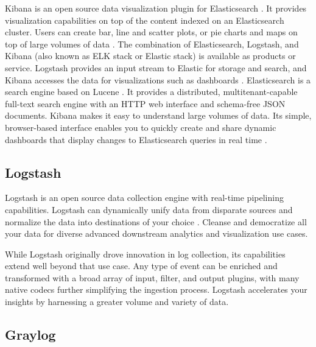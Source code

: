     Kibana is an open source data visualization plugin for
    Elasticsearch \cite{www-kibana-1}. It provides visualization
    capabilities on top of the content indexed on an Elasticsearch
    cluster. Users can create bar, line and scatter plots, or pie
    charts and maps on top of large volumes of
    data \cite{www-kibana-2}. The combination of Elasticsearch,
    Logstash, and Kibana (also known as ELK stack or Elastic stack) is
    available as products or service. Logstash provides an input
    stream to Elastic for storage and search, and Kibana accesses the
    data for visualizations such as dashboards \cite{www-kibana-3}.
    Elasticsearch is a search engine based on
    Lucene \cite{www-kibana-4}. It provides a distributed,
    multitenant-capable full-text search engine with an HTTP web
    interface and schema-free JSON documents. Kibana makes it easy to
    understand large volumes of data. Its simple, browser-based
    interface enables you to quickly create and share dynamic
    dashboards that display changes to Elasticsearch queries in real
    time \cite{www-kibana-5} \cite{www-kibana-6}.

\subsection{Logstash}

    Logstash is an open source data collection engine with real-time
    pipelining capabilities. Logstash can dynamically unify data from
    disparate sources and normalize the data into destinations of your
    choice \cite{www-logstash}. Cleanse and democratize all your data
    for diverse advanced downstream analytics and visualization use
    cases.

    While Logstash originally drove innovation in log collection, its
    capabilities extend well beyond that use case. Any type of event
    can be enriched and transformed with a broad array of input,
    filter, and output plugins, with many native codecs further
    simplifying the ingestion process. Logstash accelerates your
    insights by harnessing a greater volume and variety of data.
	
\subsection{Graylog}

